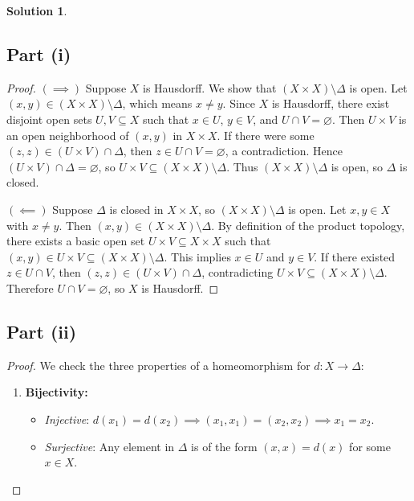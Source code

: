 \documentclass[11pt, a4paper]{article}
\theoremstyle{definition}
\newtheorem*{solution}{Solution}
\begin{document}
\begin{solution}
\subsection*{Part (i)}
\begin{proof}
$(\implies)$ Suppose $X$ is Hausdorff. We show that $(X \times X) \setminus \Delta$ is open.
Let $(x, y) \in (X \times X) \setminus \Delta$, which means $x \neq y$. Since $X$ is Hausdorff, there exist disjoint open sets $U, V \subseteq X$ such that $x \in U$, $y \in V$, and $U \cap V = \varnothing$.
Then $U \times V$ is an open neighborhood of $(x, y)$ in $X \times X$. If there were some $(z, z) \in (U \times V) \cap \Delta$, then $z \in U \cap V = \varnothing$, a contradiction.
Hence $(U \times V) \cap \Delta = \varnothing$, so $U \times V \subseteq (X \times X) \setminus \Delta$. Thus $(X \times X) \setminus \Delta$ is open, so $\Delta$ is closed.

\smallskip
$(\impliedby)$ Suppose $\Delta$ is closed in $X \times X$, so $(X \times X) \setminus \Delta$ is open.
Let $x, y \in X$ with $x \neq y$. Then $(x, y) \in (X \times X) \setminus \Delta$.
By definition of the product topology, there exists a basic open set $U \times V \subseteq X \times X$ such that $(x, y) \in U \times V \subseteq (X \times X) \setminus \Delta$.
This implies $x \in U$ and $y \in V$. If there existed $z \in U \cap V$, then $(z, z) \in (U \times V) \cap \Delta$, contradicting $U \times V \subseteq (X \times X) \setminus \Delta$.
Therefore $U \cap V = \varnothing$, so $X$ is Hausdorff.
\end{proof}

\subsection*{Part (ii)}
\begin{proof}
We check the three properties of a homeomorphism for $d : X \to \Delta$:
\begin{enumerate}[label=\arabic*.]
    \item \textbf{Bijectivity:}
    \begin{itemize}
        \item \emph{Injective}: $d(x_1) = d(x_2) \implies (x_1, x_1) = (x_2, x_2) \implies x_1 = x_2$.
        \item \emph{Surjective}: Any element in $\Delta$ is of the form $(x, x) = d(x)$ for some $x \in X$.
    \end{itemize}


\end{enumerate}
\end{proof}
\end{solution}
\end{document}
